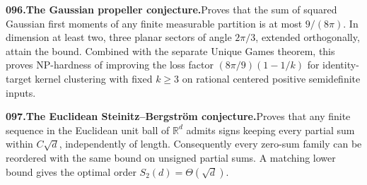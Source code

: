 \documentclass[11pt,a4paper]{article}
\begin{document}
  \par \begin{minipage}{\linewidth}
  \fontsize{10.5}{12.6}\selectfont\RaggedRight
  \hypertarget{result 096}{}
  {\bfseries\textcolor{muted}{096.}\enspace The Gaussian propeller conjecture.}\enspace Proves that the sum of squared Gaussian first moments of any finite measurable partition is at most $9/(8\pi)$. In dimension at least two, three planar sectors of angle $2\pi/3$, extended orthogonally, attain the bound. Combined with the separate Unique Games theorem, this proves NP-hardness of improving the loss factor $(8\pi/9)(1-1/k)$ for identity-target kernel clustering with fixed $k\ge3$ on rational centered positive semidefinite inputs.\par
  \end{minipage}\par\vspace{5pt}



  \par \begin{minipage}{\linewidth}
  \fontsize{10.5}{12.6}\selectfont\RaggedRight
  \hypertarget{result 097}{}
  {\bfseries\textcolor{muted}{097.}\enspace The Euclidean Steinitz--Bergstr\"om conjecture.}\enspace Proves that any finite sequence in the Euclidean unit ball of $\mathbb R^d$ admits signs keeping every partial sum within $C\sqrt d$, independently of length. Consequently every zero-sum family can be reordered with the same bound on unsigned partial sums. A matching lower bound gives the optimal order $S_2(d)=\Theta(\sqrt d)$.\par
  \end{minipage}\par\vspace{5pt}
\end{document}
